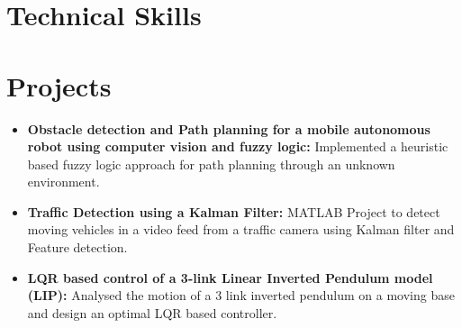 \documentclass[letter,11pt]{article}
\newcommand{\projectItem}[2]{
  \item \small{
    \textbf{#1: }{#2 \vspace{-2mm}}
  }
}
\newcommand{\resumeSubHeadingListStart}{\begin{itemize}[leftmargin=*]}
\newcommand{\resumeSubHeadingListEnd}{\end{itemize}}
\begin{document}
  \vspace{-6mm}
\section{Technical Skills}
\vspace{-4mm}
\begin{table}[h]
  \centering
  \end{table}

  \vspace{-4mm}
\section{Projects}
  \resumeSubHeadingListStart
    \projectItem{Obstacle detection and Path planning for a mobile autonomous robot using computer vision and fuzzy logic}
      {Implemented a heuristic based fuzzy logic approach for path planning through an unknown environment.}
    \projectItem{Traffic Detection using a Kalman Filter}
      {MATLAB Project to detect moving vehicles in a video feed from a traffic
      camera using Kalman filter and Feature detection.}
    \projectItem{LQR based control of a 3-link Linear Inverted Pendulum model (LIP)}
      {
        Analysed the motion of a 3 link inverted pendulum on a moving base and design an optimal LQR based controller.
      }
  \resumeSubHeadingListEnd


\end{document}

